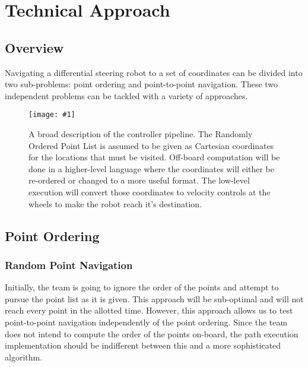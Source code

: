 \documentclass[12pt,conference,onecolumn]{IEEEtran} %
\newcommand{\myfigure}[4]{
  \begin{figure}[h!]
      \centering
      \texttt{[image: \#1]}
      \caption{#2}
\label{#4}
    \end{figure}
}
\begin{document}
\section{Technical Approach}

\subsection{Overview}
Navigating a differential steering robot to a set of coordinates can be divided into two sub-problems: point ordering and point-to-point navigation. These two independent problems can be tackled with a variety of approaches.

\myfigure{images/Pipeline.jpg}{A broad description of the controller pipeline. The Randomly Ordered Point List is assumed to be given as Cartesian coordinates for the locations that must be visited. Off-board computation will be done in a higher-level language where the coordinates will either be re-ordered or changed to a more useful format. The low-level execution will convert those coordinates to velocity controls at the wheels to make the robot reach it's destination.}{0.5}{fig:pipeline}

\subsection{Point Ordering}
\subsubsection{Random Point Navigation}
Initially, the team is going to ignore the order of the points and attempt to pursue the point list as it is given. This approach will be sub-optimal and will not reach every point in the allotted time. However, this approach allows us to test point-to-point navigation independently of the point ordering. Since the team does not intend to compute the order of the points on-board, the path execution implementation should be indifferent between this and a more sophisticated algorithm.
\end{document}

